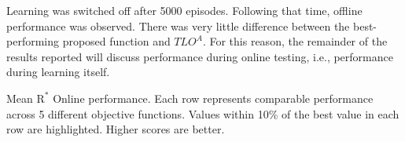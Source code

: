 Learning was switched off after 5000 episodes. Following that time, offline performance was observed. There was very little difference between the best-performing proposed function and $TLO^A$. For this reason, the remainder of the results reported will discuss performance during online testing, i.e., performance during learning itself.%


\begin{table}[t]
\scriptsize
  \caption{Mean $\text{R}^*$ Online performance. Each row represents comparable performance across 5 different objective functions. Values within 10\% of the best value in each row are highlighted. Higher scores are better.}
  \label{tab:mean_r_star_performance}

\end{table}

 


